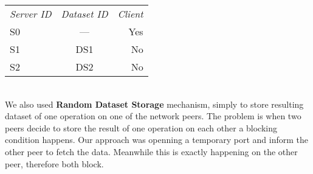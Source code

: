 \begin{tabular}{ l c r }
\em{Server ID} & \em{ Dataset ID} & \em{ Client} \\
S0 & --- & Yes \\
S1 & DS1 & No \\
S2 & DS2 & No \\
\end{tabular}\\

We also used \textbf{Random Dataset Storage} mechanism, simply to store resulting dataset of one operation on one of the network
peers. The problem is when two peers decide to store the result of one operation on each other a blocking condition happens. Our
approach was openning a temporary port and inform the other peer to fetch the data. Meanwhile this is exactly happening on the other
peer, therefore both block.
